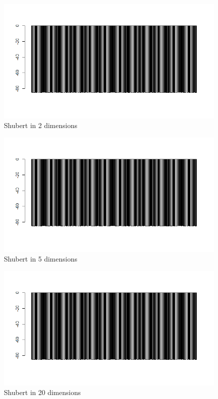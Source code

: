 \documentclass{article}
\begin{document}
\begin{figure}[h!]
    \centering
    \includegraphics[width=1\textwidth]{./results/Shubert2}
    \caption{Shubert in 2 dimensions}
    \label{fig:Shubert in 2 dimensions}
\end{figure}

\begin{figure}[h!]
    \centering
    \includegraphics[width=1\textwidth]{./results/Shubert5}
    \caption{Shubert in 5 dimensions}
    \label{fig:Shubert in 5 dimensions}
\end{figure}

\begin{figure}[h!]
    \centering
    \includegraphics[width=1\textwidth]{./results/Shubert20}
    \caption{Shubert in 20 dimensions}
    \label{fig:Shubert in 20 dimensions}
\end{figure}
\end{document}

